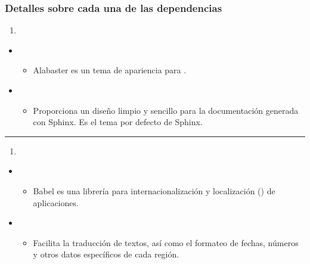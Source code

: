 \documentclass[a4paper,10pt,spanish]{sphinxmanual}
\begin{document}
\subsubsection{Detalles sobre cada una de las dependencias}
\label{\detokenize{configuracion_inicial/002.instalacion_librerias:detalles-sobre-cada-una-de-las-dependencias}}\begin{enumerate}
%
\item {} 
\sphinxAtStartPar
{}

\end{enumerate}
\begin{itemize}
\item {} 
\sphinxAtStartPar
{}
\begin{itemize}
\item {} 
\sphinxAtStartPar
Alabaster es un tema de apariencia para .

\end{itemize}

\item {} 
\sphinxAtStartPar
{}
\begin{itemize}
\item {} 
\sphinxAtStartPar
Proporciona un diseño limpio y sencillo para la documentación generada con Sphinx. Es el tema por defecto de Sphinx.

\end{itemize}

\end{itemize}


\bigskip\hrule\bigskip

\begin{enumerate}
%
\setcounter{enumi}{1}
\item {} 
\sphinxAtStartPar
{}

\end{enumerate}
\begin{itemize}
\item {} 
\sphinxAtStartPar
{}
\begin{itemize}
\item {} 
\sphinxAtStartPar
Babel es una librería para internacionalización y localización () de aplicaciones.

\end{itemize}

\item {} 
\sphinxAtStartPar
{}
\begin{itemize}
\item {} 
\sphinxAtStartPar
Facilita la traducción de textos, así como el formateo de fechas, números y otros datos específicos de cada región.

\end{itemize}

\end{itemize}
\end{document}
